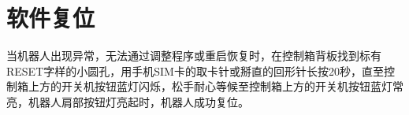 \chapter{软件复位}

当机器人出现异常，无法通过调整程序或重启恢复时，在控制箱背板找到标有{\sf RESET}字样的小圆孔，用手机SIM卡的取卡针或掰直的回形针长按20秒，直至控制箱上方的开关机按钮蓝灯闪烁，松手耐心等候至控制箱上方的开关机按钮蓝灯常亮，机器人肩部按钮灯亮起时，机器人成功复位。

